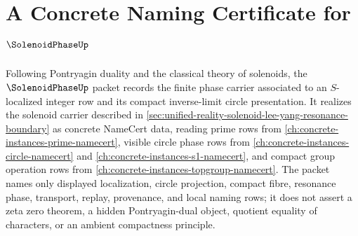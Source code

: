 \chapter{A Concrete Naming Certificate for $\SolenoidPhaseUp$}
\label{ch:concrete-instances-solenoid-phase-namecert}

Following Pontryagin duality and the classical theory of solenoids, the $\SolenoidPhaseUp$ packet records the finite phase carrier associated to an $S$-localized integer row and its compact inverse-limit circle presentation. It realizes the solenoid carrier described in \autoref{sec:unified-reality-solenoid-lee-yang-resonance-boundary} as concrete NameCert data, reading prime rows from \autoref{ch:concrete-instances-prime-namecert}, visible circle phase rows from \autoref{ch:concrete-instances-circle-namecert} and \autoref{ch:concrete-instances-s1-namecert}, and compact group operation rows from \autoref{ch:concrete-instances-topgroup-namecert}. The packet names only displayed localization, circle projection, compact fibre, resonance phase, transport, replay, provenance, and local naming rows; it does not assert a zeta zero theorem, a hidden Pontryagin-dual object, quotient equality of characters, or an ambient compactness principle.

